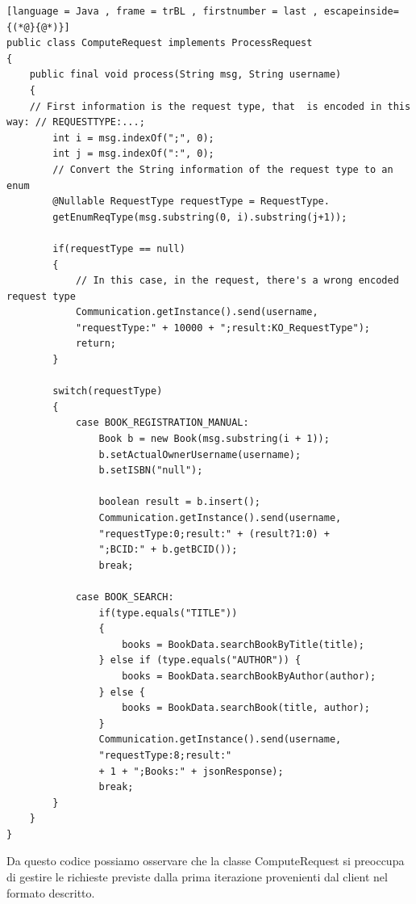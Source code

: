 \begin{lstlisting}[language = Java , frame = trBL , firstnumber = last , escapeinside={(*@}{@*)}]
public class ComputeRequest implements ProcessRequest
{ 
	public final void process(String msg, String username) 
	{
	// First information is the request type, that  is encoded in this way: // REQUESTTYPE:...;
		int i = msg.indexOf(";", 0);
		int j = msg.indexOf(":", 0);
		// Convert the String information of the request type to an enum
		@Nullable RequestType requestType = RequestType.
		getEnumReqType(msg.substring(0, i).substring(j+1));

		if(requestType == null)
		{
			// In this case, in the request, there's a wrong encoded request type
			Communication.getInstance().send(username,
			"requestType:" + 10000 + ";result:KO_RequestType");
			return;
		}

		switch(requestType) 
		{
			case BOOK_REGISTRATION_MANUAL:
				Book b = new Book(msg.substring(i + 1));
				b.setActualOwnerUsername(username);
				b.setISBN("null");

				boolean result = b.insert();
				Communication.getInstance().send(username,
				"requestType:0;result:" + (result?1:0) + 
				";BCID:" + b.getBCID());
				break;
				
			case BOOK_SEARCH:
				if(type.equals("TITLE")) 
				{
					books = BookData.searchBookByTitle(title);
				} else if (type.equals("AUTHOR")) {
					books = BookData.searchBookByAuthor(author);
				} else {
					books = BookData.searchBook(title, author);
				}
				Communication.getInstance().send(username, 
				"requestType:8;result:" 
				+ 1 + ";Books:" + jsonResponse);
				break;
		}
	}
}
\end{lstlisting}
\noindent Da questo codice possiamo osservare che la classe ComputeRequest si preoccupa di gestire le richieste previste dalla prima iterazione provenienti dal client nel formato descritto.